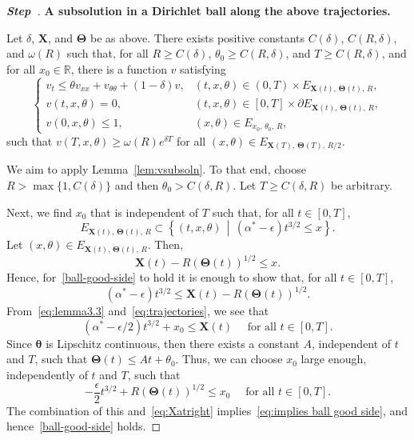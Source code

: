 \documentclass[AHL,Unicode,longabstracts]{cedram}
\newcommand{\R}{\mathbb{R}}
\newcommand{\bX}{\mathbf{X}}
\newcommand{\btheta}{\boldsymbol{\theta}}
\newcommand{\bTheta}{\boldsymbol{\Theta}}
\newcommand{\1}{\mathds{1}}
\newcommand{\e}{\epsilon}
\newcounter{stepcount}
\newenvironment{stepl}[1]{\refstepcounter{stepcount}\begin{proof}[\textbf{Step~\thestepcount}]{\bf{#1}}}{\let\qed\relax\end{proof}}
\begin{document}
\begin{proofc}
\begin{stepl}{A subsolution in a Dirichlet ball along the above trajectories.}
\begin{lemm}\label{lem:vsubsoln}
Let $\delta$, $\bX$, and $\bTheta$ be as above. There exists positive constants $C(\delta)$, $C(R,\delta)$, and $\omega(R)$ such that, for all $R\geq C(\delta)$, $\theta_0\geq C(R,\delta)$, and $T\geq C(R,\delta)$, and for all $x_0\in \R$, there is a function $v$ satisfying
\begin{equation}\label{eq:v-subsol}
\begin{cases}
v_t \leq \theta v_{xx} + v_{\theta\theta}+(1-\delta)v, & (t,x,\theta) \in (0,T)\times E_{\bX(t),\,\bTheta(t),\,R},
\\[0.10em]
v(t,x,\theta)=0, & (t,x,\theta) \in [0,T]\times \partial E_{\bX(t),\,\bTheta(t),\,R},
\\[0.10em]
v(0,x,\theta) \leq 1, & (x,\theta) \in E_{x_0,\,\theta_0,\,R},
\end{cases}
\end{equation}
such that $v(T,x,\theta) \geq \omega(R) e^{\delta T}$ for all $(x,\theta) \in E_{\bX(T),\,\bTheta(T),\,R/2}$.
\end{lemm}


We aim to apply Lemma~\ref{lem:vsubsoln}. To that end, choose $R>\max\{1,C(\delta)\}$ and then $\theta_0 > C(\delta,R)$. Let $T\geq C(\delta,R)$ be arbitrary.

Next, we find $x_0$ that is independent of $T$ such that, for all $t\in [0,T]$,
\begin{equation}\label{ball-good-side}
E_{\bX(t),\,\bTheta(t),\,R} \subset \left\{(t,x,\theta)\,\middle|\, \left(\alpha^{*}-\e\right)t^{3/2} \leq x \right\}.
\end{equation}
Let $(x, \theta)\in E_{\bX(t),\,\bTheta(t),\,R}$. Then,
\[
\bX(t) - R(\bTheta(t))^{1/2}\leq x.
\]
Hence, for~\eqref{ball-good-side} to hold it is enough to show that, for all $t\in [0,T]$,
\begin{equation}\label{eq:implies ball good side}
\left(\alpha^{*}-\e\right)t^{3/2} \leq \bX(t)-R(\bTheta(t))^{1/2}.
\end{equation}
From~\eqref{eq:lemma3.3} and~\eqref{eq:trajectories}, we see that
\begin{equation}\label{eq:Xatright}
\left(\alpha^*-\e/2\right)t^{3/2} + x_0 \leq \bX(t) \quad \text{ for all }t\in [0,T].
\end{equation}
Since $\btheta$ is Lipschitz continuous, then there exists a constant $A$, independent of $t$ and $T$, such that $\bTheta(t)\leq At+\theta_0$. Thus, we can choose $x_0$ large enough, independently of $t$ and $T$, such that
\[
-\frac{\e}{2}t^{3/2} +R(\bTheta(t))^{1/2} \leq x_0 \quad \text{ for all }t\in [0,T].
\]
The combination of this and~\eqref{eq:Xatright} implies~\eqref{eq:implies ball good side}, and hence~\eqref{ball-good-side} holds.
\end{stepl}



\end{proofc}
\end{document}

